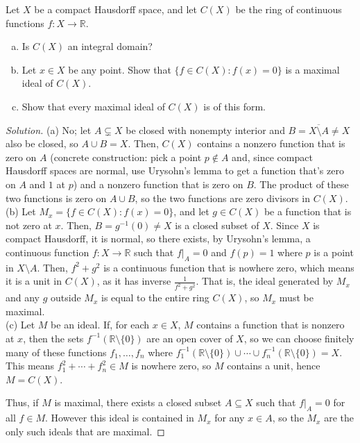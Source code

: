 \documentclass[10pt]{article}
\providecommand{\ol}{\overline}
\providecommand{\RR}{\mathbb R}
\providecommand{\ii}{\item}
\providecommand{\inv}{^{-1}}
\newenvironment{soln}{\begin{proof}[Solution]}{\end{proof}}
\begin{document}
\begin{problem}
    Let $X$ be a compact Hausdorff space, and let $C(X)$
    be the ring of continuous functions $f\colon X\to\RR$.
    \begin{enumerate}[(a)]
        \ii Is $C(X)$ an integral domain?
	\ii Let $x\in X$ be any point. Show that
	$\{f\in C(X) : f(x) = 0\}$ is a maximal ideal of $C(X)$.
	\ii Show that every maximal ideal of $C(X)$ is of this form.
    \end{enumerate}
\end{problem}

\begin{soln}
    (a) No; let $A\subsetneq X$ be closed with nonempty interior
    and $B = \ol{X\setminus A} \ne X$ also be closed, so $A\cup B = X$.
    Then, $C(X)$ contains a nonzero function that is zero on $A$
    (concrete construction:
    pick a point $p\notin A$ and, since compact Hausdorff spaces are normal,
    use Urysohn's lemma to get a function that's zero on $A$ and $1$ at $p$)
    and a nonzero function that is zero on $B$.
    The product of these two functions is zero on $A\cup B$,
    so the two functions are zero divisors in $C(X)$.
    \\

    (b) Let $M_x = \{f\in C(X) : f(x) = 0\}$,
    and let $g\in C(X)$ be a function that is not zero at $x$.
    Then, $B = g\inv(0)\ne X$ is a closed subset of $X$.
    Since $X$ is compact Hausdorff, it is normal, so
    there exists, by Urysohn's lemma, a continuous function
    $f\colon X\to\RR$ such that $f|_A = 0$ and $f(p) = 1$
    where $p$ is a point in $X\setminus A$.
    Then, $f^2 + g^2$ is a continuous function that is nowhere zero,
    which means it is a unit in $C(X)$, as it has inverse
    $\frac{1}{f^2 + g^2}$. That is, the ideal generated by $M_x$
    and any $g$ outside $M_x$ is equal to the entire ring $C(X)$,
    so $M_x$ must be maximal.
    \\

    (c) Let $M$ be an ideal.
    If, for each $x\in X$, $M$ contains a function that is nonzero at $x$,
    then the sets $f\inv(\RR\setminus\{0\})$ are an open cover of $X$,
    so we can choose finitely many of these functions $f_1,\dots,f_n$
    where $f_1\inv(\RR\setminus\{0\})\cup\cdots\cup f_n\inv(\RR\setminus\{0\}) = X$.
    This means $f_1^2 + \cdots + f_n^2\in M$ is nowhere zero, so $M$
    contains a unit, hence $M = C(X)$.

    Thus, if $M$ is maximal, there exists a closed subset $A\subseteq X$ such that
    $f|_A = 0$ for all $f\in M$. However this ideal is contained in $M_x$
    for any $x\in A$, so the $M_x$ are the only such ideals that are maximal.
\end{soln}
\end{document}
